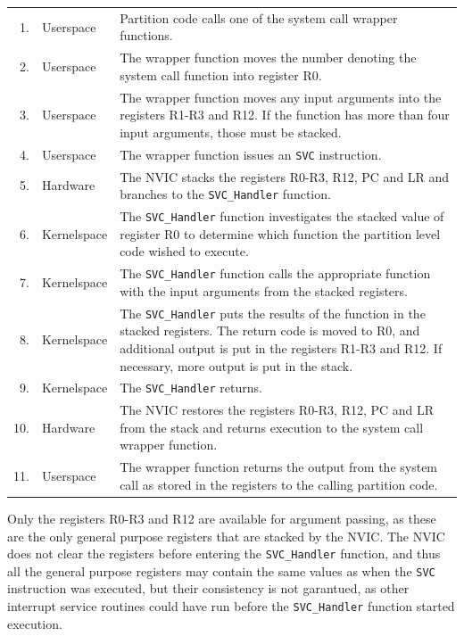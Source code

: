 \begin{tabular}{ r l p{11cm} }
    1. & Userspace & Partition code calls one of the system call wrapper
    functions.\\
    2. & Userspace & The wrapper function moves the number denoting the system
    call function into register R0.\\
    3. & Userspace & The wrapper function moves any input arguments into the
    registers R1-R3 and R12. If the function has more than four input arguments,
    those must be stacked.\\
    4. & Userspace & The wrapper function issues an \texttt{SVC} instruction.\\
    5. & Hardware & The NVIC stacks the registers R0-R3, R12, PC and LR and
    branches to the \texttt{SVC\_Handler} function.\\
    6. & Kernelspace & The \texttt{SVC\_Handler} function investigates the
    stacked value of register R0 to determine which function the partition level
    code wished to execute.\\
    7. & Kernelspace & The \texttt{SVC\_Handler} function calls the appropriate
    function with the input arguments from the stacked registers.\\
    8. & Kernelspace & The \texttt{SVC\_Handler} puts the results of the
    function in the stacked registers. The return code is moved to R0, and
    additional output is put in the registers R1-R3 and R12. If necessary, more
    output is put in the stack.\\
    9. & Kernelspace & The \texttt{SVC\_Handler} returns.\\
    10. & Hardware & The NVIC restores the registers R0-R3, R12, PC and LR from
    the stack and returns execution to the system call wrapper function.\\
    11. & Userspace & The wrapper function returns the output from the system
    call as stored in the registers to the calling partition code.\\
\end{tabular}
Only the registers R0-R3 and R12 are available for argument passing, as these
are the only general purpose registers that are stacked by the NVIC. The NVIC
does not clear the registers before entering the \texttt{SVC\_Handler} function,
and thus all the general purpose registers may contain the same values as when
the \texttt{SVC} instruction was executed, but their consistency is not
garantued, as other interrupt service routines could have run before the
\texttt{SVC\_Handler} function started execution.\\
